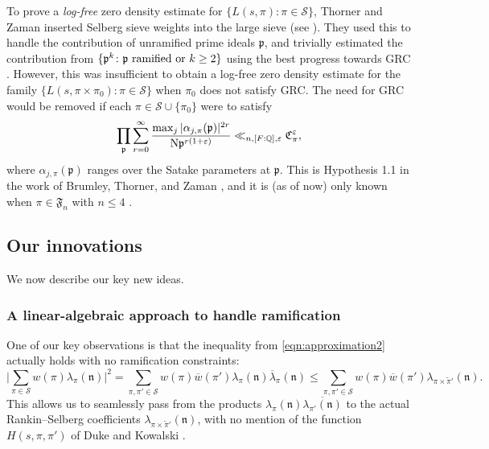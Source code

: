 \documentclass[11pt]{amsart}
\theoremstyle{remark}
\numberwithin{equation}{section}
\newcommand{\p}{\mathfrak{p}}
\newcommand{\kp}{\mathfrak{p}}
\newcommand{\kn}{\mathfrak{n}}
\newcommand{\N}{\textnormal{N}}
\newcommand{\Q}{\mathbb{Q}}
\newcommand{\mS}{\mathcal{S}}
\renewcommand{\bar}{\overline}
\renewcommand{\tilde}{\widetilde}
\renewcommand{\epsilon}{\varepsilon}
\begin{document}
To prove a \emph{log-free} zero density estimate for $\{L(s,\pi)\colon \pi\in\mathcal{S}\}$, Thorner and Zaman \cite{TZ_GLn} inserted Selberg sieve weights into the large sieve (see \cite[Theorem 4.2]{TZ_GLn}). They used this to handle the contribution of unramified prime ideals $\p$, and trivially estimated the contribution from $\{\kp^k\colon \textup{$\kp$ ramified or $k\geq 2$}\}$ using the best progress towards GRC \cite{MS,luo1999generalized}. However, this was insufficient to obtain a log-free zero density estimate for the family $\{L(s,\pi\times\pi_0)\colon \pi\in\mathcal{S}\}$ when $\pi_0$ does not satisfy GRC. The need for GRC would be removed if each $\pi\in\mathcal{S}\cup\{\pi_0\}$ were to satisfy
\begin{equation}
\label{eqn:hyp_BTZ}
\prod_{\kp}\sum_{r=0}^{\infty}\frac{\max_j |\alpha_{j,\pi}(\kp)|^{2r}}{\N\kp^{r(1+\epsilon)}}\ll_{n,[F:\Q],\epsilon}\mathfrak{C}_{\pi}^{\epsilon},
\end{equation}
where $\alpha_{j,\pi}(\kp)$ ranges over the Satake parameters at $\kp$.  This is Hypothesis 1.1 in the work of Brumley, Thorner, and Zaman \cite{BrumleyThornerZaman}, and it is (as of now) only known when $\pi\in\mathfrak{F}_n$ with $n\leq 4$ \cite{Brumley_2}.



\subsection{Our innovations}
We now describe our key new ideas.

\subsubsection{A linear-algebraic approach to handle ramification}
One of our key observations is that the inequality from \eqref{eqn:approximation2} actually holds with no ramification constraints:
\begin{equation}
\label{eqn:key-inequality}
    \Bigg| \sum_{\pi \in \mS} w(\pi) \lambda_\pi(\kn) \Bigg|^2 
    =
    \sum_{\pi, \pi' \in \mS} w(\pi) \bar w(\pi') \lambda_\pi(\kn) \bar\lambda_{\pi}(\kn)
    \le 
    \sum_{\pi, \pi' \in \mS} w(\pi) \bar w(\pi') \lambda_{\pi \times \tilde \pi'}(\kn).
\end{equation}
This allows us to seamlessly pass from the products $\lambda_\pi(\kn) \bar{\lambda_{\pi'}(\kn)}$ to the actual Rankin--Selberg coefficients $\lambda_{\pi\times\tilde{\pi}'}(\kn)$, with no mention of the function $H(s, \pi, \pi')$ of Duke and Kowalski \cite{DK}.
\end{document}
